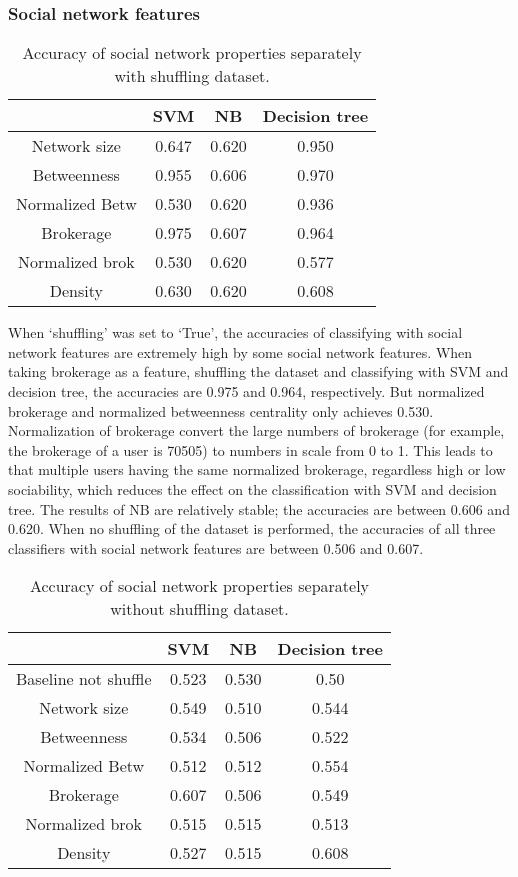 \documentclass[
10pt, %
a4paper, %
oneside, %
headinclude,footinclude, %
] {book}%
\begin{document}
\subsubsection{Social network features}
\begin{table}[hbtp]\centering
\caption{Accuracy of social network properties separately with shuffling dataset.\label{table:sose}}
\begin{tabular}{|cccc|}
\hline
 & SVM & NB & Decision tree\\
\hline
Network size & 0.647 & 0.620 & 0.950\\
Betweenness & 0.955 & 0.606 & 0.970\\
Normalized Betw & 0.530 & 0.620 & 0.936\\
Brokerage & 0.975 & 0.607 & 0.964\\
Normalized brok & 0.530 & 0.620 & 0.577\\
Density & 0.630 & 0.620 & 0.608\\
\hline
\end{tabular}
\end{table}

When ‘shuffling’ was set to ‘True’, the accuracies of classifying with social network features are extremely high by some social network features. When taking brokerage as a feature, shuffling the dataset and classifying with SVM and decision tree, the accuracies are 0.975 and 0.964, respectively. But normalized brokerage and normalized betweenness centrality only achieves 0.530. Normalization of brokerage convert the large numbers of brokerage (for example, the brokerage of a user is 70505) to numbers in scale from 0 to 1. This leads to that multiple users having the same normalized brokerage, regardless high or low sociability, which reduces the effect on the classification with SVM and decision tree. The results of NB are relatively stable; the accuracies are between 0.606 and 0.620. When no shuffling of the dataset is performed, the accuracies of all three classifiers with social network features are between 0.506 and 0.607.

\begin{table}[hbtp]\centering
\caption{Accuracy of social network properties separately without shuffling dataset.\label{table:soso}}
\begin{tabular}{|cccc|}
\hline
 & SVM & NB & Decision tree\\
\hline
Baseline not shuffle & 0.523 & 0.530 & 0.50\\
Network size & 0.549 & 0.510 & 0.544\\
Betweenness & 0.534 & 0.506 & 0.522\\
Normalized Betw & 0.512 & 0.512 & 0.554\\
Brokerage & 0.607 & 0.506 & 0.549\\
Normalized brok & 0.515 & 0.515 & 0.513\\
Density & 0.527 & 0.515 & 0.608\\
\hline
\end{tabular}
\end{table}
\end{document}

